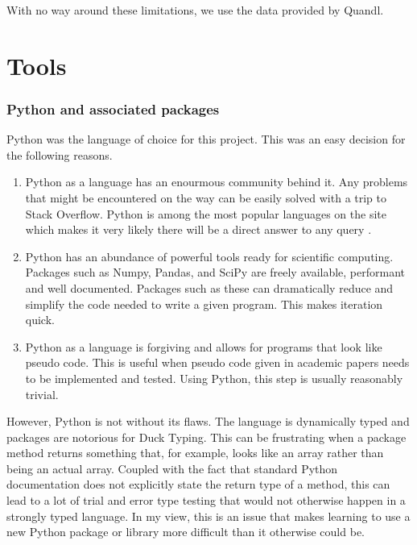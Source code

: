 \documentclass{report}
\begin{document}
With no way around these limitations, we use the data provided by Quandl.

\section{Tools}
\subsubsection{Python and associated packages}

Python was the language of choice for this project. This was an easy decision for the following reasons.

\begin{enumerate}
  \item Python as a language has an enourmous community behind it. Any problems that might be encountered on the way can be easily solved with a trip to Stack Overflow. Python is among the most popular languages on the site which makes it very likely there will be a direct answer to any query \cite{website:redmonk-languages}. 
  
  \item Python has an abundance of powerful tools ready for scientific computing. Packages such as Numpy, Pandas, and SciPy are freely available, performant and well documented. Packages such as these can dramatically reduce and simplify the code needed to write a given program. This makes iteration quick.

  \item Python as a language is forgiving and allows for programs that look like pseudo code. This is useful when pseudo code given in academic papers needs to be implemented and tested. Using Python, this step is usually reasonably trivial.

\end{enumerate}

However, Python is not without its flaws. The language is dynamically typed and packages are notorious for Duck Typing. This can be frustrating when a package method returns something that, for example, looks like an array rather than being an actual array. Coupled with the fact that standard Python documentation does not explicitly state the return type of a method, this can lead to a lot of trial and error type testing that would not otherwise happen in a strongly typed language. In my view, this is an issue that makes learning to use a new Python package or library more difficult than it otherwise could be.
\end{document}
